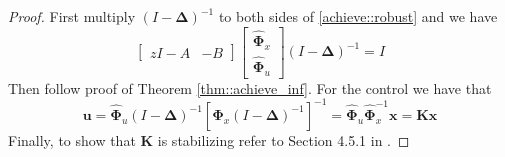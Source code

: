 \documentclass{article}[12pt]
\begin{document}
\begin{proof}
First multiply $(I-\mathbf{\Delta})^{-1}$ to both sides of \eqref{achieve::robust} and we have
\begin{equation}
    \left[\begin{array}{cc}{z I-A} & {-B}\end{array}\right]\left[\begin{array}{c}{\hat{\mathbf{\Phi}}_{x}} \\ {\hat{\mathbf{\Phi}}_{u}}\end{array}\right] (I-\mathbf{\Delta})^{-1} = I
\end{equation}
Then follow proof of Theorem \ref{thm::achieve_inf}. For the control we have that
\begin{equation}
    \mathbf{u} = \hat{\mathbf{\Phi}}_{u} (I-\mathbf{\Delta})^{-1}  \left[ \hat{\mathbf{\Phi}}_{x} (I-\mathbf{\Delta})^{-1} \right]^{-1} = \hat{\mathbf{\Phi}}_{u} \hat{\mathbf{\Phi}}_{x}^{-1} \mathbf{x} = \mathbf{K} \mathbf{x}
\end{equation}
Finally, to show that $\mathbf{K}$ is stabilizing refer to Section 4.5.1 in \cite{anderson2019system}.
\end{proof}
\end{document}
